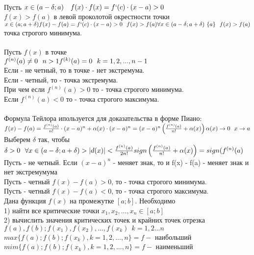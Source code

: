  \\
Пусть $x \in (a - \delta; a) \quad f(x) \cdot f(x) = f`(c) \cdot (x - a) > 0 $ \\  %
$f(x) > f(a)$ в левой проколотой окрестности точки  \\
$x \in (a; a + \delta) \\
f(x) - f(a) = f`(c) \cdot (x - a) > 0 ~~ f(x) > f(a) \\
\forall x \in (a - \delta; a+ \delta) \ \{a\} ~~ f(x) > f(a)$ \\
точка строгого минимума. \\

 \\
Пусть $f(x)$ в точке  \\
$f^{(n)} (a) \neq 0 ~~ n > 1 \\
f^{(k)} (a) = 0 ~~ k = 1, 2, ..., n-1$ \\ 
Если  - не четный, то в точке  - нет экстремума. \\
Если  - четный, то  - точка экстремума. \\
При чем если $f^{(n)} (a) > 0$ то  - точка строгого минимума. \\
Если  $f^{(n)} (a) < 0$ то  - точка строгого максимума. \\

 \\
Формула Тейлора ипользуется для доказательства в форме Пиано: \\
$f(x) - f(a) = \frac {f^{(n)} (a)} {n!} \cdot (x - a)^n + \alpha (x) \cdot (x - a)^n = (x - a)^n \left ( \frac {f^{(n)} (a)} { n!} + \alpha(x) \right) \\
\alpha (x) \to 0 ~~ x \to a$ \\
Выберем $\delta$ так, чтобы $\delta > 0 ~~ \forall x \in (a - \delta; a + \delta) > |d(x)| < \frac {f^{(n)}(a)}{2n!} \\
sign \left ( \frac {f^{(n)} (a)} {n!} + \alpha(x) \right) = sign (f^{(n)} (a)$ \\
Пусть  - не четный. Если $(x - a)^n$ - меняет знак, то и f(x) - f(a) - меняет знак и нет экстремумума \\
Пусть  - четный $f(x) - f(a) > 0$, то  - точка строгого минимума. \\
Пусть  - четный $f(x) - f(a) < 0$, то  - точка строгого максимума. \\

Дана функция $f(x)$ на промежутке $[a;b]$. Необходимо \\
1) найти все критические точки $x_{1}, x_{2}, ..., x_{n} \in [a; b]$ \\
2) вычислить значения критических точек и крайних точек отрезка 
$f(a), f(b); f(x_{1}), f(x_{2}), ..., f(x_{k}) ~~ k = 1, 2 ... n$ \\

$max \{f(a); f(b); f(x_{k}), k = 1, 2, ..., n\} = f - $ наибольший \\
$mim \{f(a); f(b); f(x_{k}), k = 1, 2, ..., n\} = f - $  наименьший\\